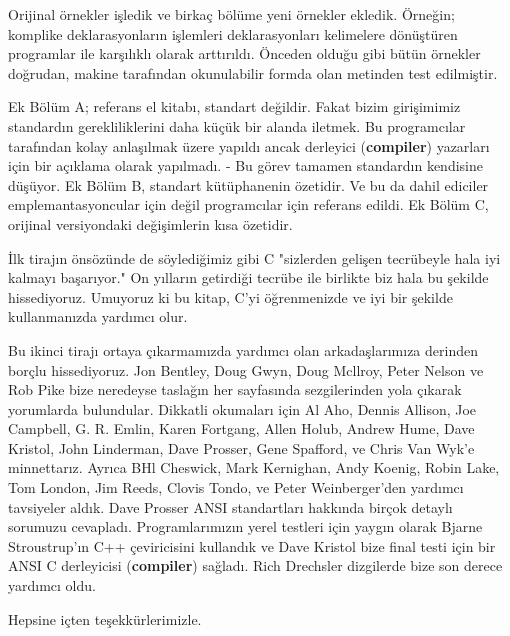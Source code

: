 \documentclass[a4paper,12pt,oneside]{book}
\begin{document}
\thispagestyle{preface} \noindent Orijinal örnekler işledik ve birkaç bölüme yeni örnekler ekledik. Örneğin; komplike deklarasyonların işlemleri deklarasyonları kelimelere dönüştüren programlar ile karşılıklı olarak arttırıldı. Önceden olduğu gibi bütün örnekler doğrudan, makine tarafından okunulabilir formda olan metinden test edilmiştir.
\par Ek Bölüm A; referans el kitabı, standart değildir. Fakat bizim girişimimiz standardın gerekliliklerini daha küçük bir alanda iletmek. Bu programcılar tarafından kolay anlaşılmak üzere yapıldı ancak derleyici (\textbf{compiler}) yazarları için bir açıklama olarak yapılmadı. - Bu görev tamamen standardın kendisine düşüyor. Ek Bölüm B, standart kütüphanenin özetidir. Ve bu da dahil ediciler emplemantasyoncular için değil programcılar için referans edildi. Ek Bölüm C, orijinal versiyondaki değişimlerin kısa özetidir.
\par İlk tirajın önsözünde de söylediğimiz gibi C "sizlerden gelişen tecrübeyle hala iyi kalmayı başarıyor." On yılların getirdiği tecrübe ile birlikte biz hala bu şekilde hissediyoruz. Umuyoruz ki bu kitap, C'yi öğrenmenizde ve iyi bir şekilde kullanmanızda yardımcı olur.
\par Bu ikinci tirajı ortaya çıkarmamızda yardımcı olan arkadaşlarımıza derinden borçlu hissediyoruz.  Jon Bentley, Doug Gwyn, Doug Mcllroy, Peter Nelson ve Rob Pike bize neredeyse taslağın her sayfasında sezgilerinden yola çıkarak yorumlarda bulundular. Dikkatli okumaları için  Al Aho, Dennis Allison, Joe Campbell, G. R. Emlin, Karen Fortgang, Allen Holub, Andrew Hume, Dave Kristol, John Linderman, Dave Prosser, Gene Spafford, ve Chris Van Wyk'e minnettarız. Ayrıca  BHl Cheswick, Mark Kernighan, Andy Koenig, Robin Lake, Tom London, Jim Reeds, Clovis Tondo, ve Peter Weinberger'den yardımcı tavsiyeler aldık. Dave Prosser ANSI standartları hakkında birçok detaylı sorumuzu cevapladı. Programlarımızın yerel testleri için yaygın olarak  Bjarne Stroustrup'ın C++ çeviricisini kullandık ve Dave Kristol bize final testi için bir ANSI C derleyicisi (\textbf{compiler}) sağladı. Rich Drechsler dizgilerde bize son derece yardımcı oldu.
\par Hepsine içten teşekkürlerimizle.
\newline

\noindent \hspace*{270pt}{Brian W. Kernighan \\}
\hspace*{280pt}{Dennis M. Ritchie}
\end{document}
